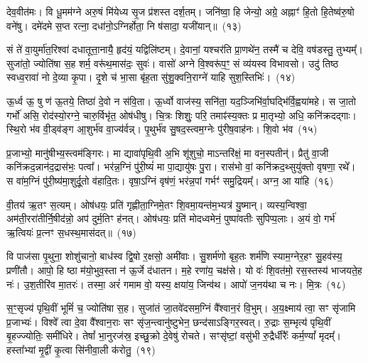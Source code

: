 देव॒वीत॑मः। वि धू॒मम॑ग्ने अरु॒षं मि॑येध्य सृ॒ज प्र॑शस्त दर्\mbox{}श॒तम्। जनि॑ष्वा॒ हि जेन्यो॒ अग्रे॒ अह्नाꣳ॑ हि॒तो हि॒तेष्व॑रु॒षो वने॑षु। दमे॑दमे स॒प्त रत्ना॒ दधा॑नो॒\-ऽग्निर्\mbox{}होता॒ नि ष॑सादा॒ यजी॑यान्॥~(१३)\ip

{\anuvakamend[{स्थ॒ ई॒धे॒ शोच॑स्व स॒प्तविꣳ॑शतिश्च}]}

सं ते॑ वा॒युर्मा॑त॒रिश्वा॑ दधातूत्ता॒नायै॒ हृद॑यं॒ यद्विलि॑ष्टम्। दे॒वानां॒ यश्चर॑ति प्रा॒णथे॑न॒ तस्मै॑ च देवि॒ वष॑डस्तु॒ तुभ्यम्᳚। सुजा॑तो॒ ज्योति॑षा स॒ह शर्म॒ वरू॑थ॒मास॑दः॒ सुवः॑। वासो॑ अग्ने वि॒श्वरू॑प॒ꣳ॒ सं व्य॑यस्व विभावसो। उदु॑ तिष्ठ स्वध्व॒रावा॑ नो दे॒व्या कृ॒पा। दृ॒शे च॑ भा॒सा बृ॑ह॒ता सु॑शु॒क्वनि॒राग्ने॑ याहि सुश॒स्तिभिः॑।~(१४)\ip

ऊ॒र्ध्व ऊ॒ षु ण॑ ऊ॒तये॒ तिष्ठा॑ दे॒वो न स॑वि॒ता। ऊ॒र्ध्वो वाज॑स्य॒ सनि॑ता॒ यद॒ञ्जिभि॑र्वा॒घद्भि॑र्वि॒ह्वया॑महे। स जा॒तो गर्भो॑ असि॒ रोद॑स्यो॒रग्ने॒ चारु॒र्विभृ॑त॒ ओष॑धीषु। चि॒त्रः शिशुः॒ परि॒ तमाꣴ॑स्य॒क्तः प्र मा॒तृभ्यो॒ अधि॒ कनि॑क्रदद्गाः। स्थि॒रो भ॑व वी॒ड्व॑ङ्ग आ॒शुर्भ॑व वा॒ज्य॑र्वन्न्। पृ॒थुर्भ॑व सु॒षद॒स्त्वम॒ग्नेः पु॑रीष॒वाह॑नः। शि॒वो भ॑व~(१५)\ip

प्र॒जाभ्यो॒ मानु॑षीभ्य॒स्त्वम॑ङ्गिरः। मा द्यावा॑\-पृथि॒वी अ॒भि शू॑शुचो॒ माऽन्तरि॑क्षं॒ मा वन॒स्पतीन्॑। प्रैतु॑ वा॒जी कनि॑क्रद॒न्नान॑द॒द्रास॑भः॒ पत्वा᳚। भर॑न्न॒ग्निं पु॑री॒ष्यं॑ मा पा॒द्यायु॑षः पु॒रा। रास॑भो वां॒ कनि॑क्रद॒थ्सुयु॑क्तो वृषणा॒ रथे᳚। स वा॑म॒ग्निं पु॑री॒ष्य॑मा॒शुर्दू॒तो व॑हादि॒तः। वृषा॒ऽग्निं वृष॑णं॒ भर॑न्न॒पां गर्भꣳ॑ समु॒द्रियम्᳚। अग्न॒ आ या॑हि~(१६)\ip

वी॒तय॑ ऋ॒तꣳ स॒त्यम्। ओष॑धयः॒ प्रति॑ गृह्णीता॒ग्निमे॒तꣳ शि॒वमा॒यन्त॑म॒भ्यत्र॑ यु॒ष्मान्। व्यस्य॒न्विश्वा॒ अम॑ती॒ररा॑तीर्नि॒षीद॑न्नो॒ अप॑ दुर्म॒तिꣳ ह॑नत्। ओष॑धयः॒ प्रति॑ मोदध्वमेनं॒ पुष्पा॑वतीः सुपिप्प॒लाः। अ॒यं वो॒ गर्भ॑ ऋ॒त्वियः॑ प्र॒त्नꣳ स॒धस्थ॒मास॑दत्॥~(१७)\ip

{\anuvakamend[{सु॒श॒स्तिभिः॑ शि॒वो भ॑व याहि॒ षट्त्रिꣳ॑शच्च}]}

वि पाज॑सा पृ॒थुना॒ शोशु॑चानो॒ बाध॑स्व द्वि॒षो र॒क्षसो॒ अमी॑वाः। सु॒शर्म॑णो बृह॒तः शर्म॑णि स्याम॒ग्नेर॒हꣳ सु॒हव॑स्य॒ प्रणी॑तौ। आपो॒ हि ष्ठा म॑यो॒भुव॒स्ता न॑ ऊ॒र्जे द॑धातन। म॒हे रणा॑य॒ चक्ष॑से। यो वः॑ शि॒वत॑मो॒ रस॒स्तस्य॑ भाजयते॒ह नः॑। उ॒श॒तीरि॑व मा॒तरः॑। तस्मा॒ अरं॑ गमाम वो॒ यस्य॒ क्षया॑य॒ जिन्व॑थ। आपो॑ ज॒नय॑था च नः। मि॒त्रः~(१८)\ip

स॒ꣳ॒सृज्य॑ पृथि॒वीं भूमिं॑ च॒ ज्योति॑षा स॒ह। सुजा॑तं जा॒तवे॑दसम॒ग्निं वै᳚श्वान॒रं वि॒भुम्। अ॒य॒क्ष्माय॑ त्वा॒ सꣳ सृ॑जामि प्र॒जाभ्यः॑। विश्वे᳚ त्वा दे॒वा वै᳚श्वान॒राः सꣳ सृ॑ज॒न्त्वानु॑ष्टुभेन॒ छन्द॑साऽङ्गिर॒स्वत्। रु॒द्राः स॒म्भृत्य॑ पृथि॒वीं बृ॒हज्ज्योतिः॒ समी॑धिरे। तेषां᳚ भा॒नुरज॑स्र॒ इच्छु॒क्रो दे॒वेषु॑ रोचते। सꣳसृ॑ष्टां॒ वसु॑भी रु॒द्रैर्धीरैः᳚ कर्म॒ण्यां᳚ मृदम्᳚। हस्ता᳚भ्यां मृ॒द्वीं कृ॒त्वा सि॑नीवा॒ली क॑रोतु॒~(१९)\ip

